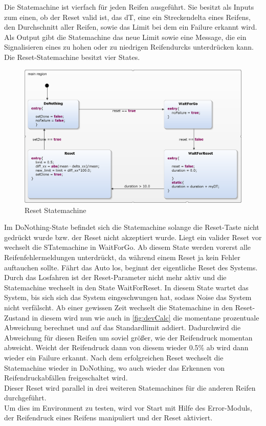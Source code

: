 Die Statemachine ist vierfach für jeden Reifen ausgeführt. Sie besitzt als Inputs zum einen, ob der Reset valid ist, das dT, eine ein Streckendelta eines Reifens, den Durchschnitt aller Reifen, sowie das Limit bei dem ein Failure erkannt wird. Als Output gibt die Statemachine das neue Limit sowie eine Message, die ein Signalisieren eines zu hohen oder zu niedrigen Reifendurcks unterdrücken kann.\\
Die Reset-Statemachine besitzt vier States.
\begin{figure}[H]
	\centering
	\includegraphics[width=1\linewidth]{../Graphiken/ResetStateMachine.png}
	\caption{Reset Statemachine}
	\label{fig:ResetStateMachine}
\end{figure}
Im DoNothing-State befindet sich die Statemachine solange die Reset-Taste nicht gedrückt wurde bzw. der Reset nicht akzeptiert wurde. Liegt ein valider Reset vor wechselt die STatemachine in WaitForGo. Ab diesem State werden vorerst alle Reifenfehlermeldungen unterdrückt, da während einem Reset ja kein Fehler auftauchen sollte. Fährt das Auto los, beginnt der eigentliche Reset des Systems. Durch das Losfahren ist der Reset-Parameter nicht mehr aktiv und die Statemachine wechselt in den State WaitForReset. In diesem State wartet das System, bis sich sich das System eingeschwungen hat, sodass Noise das System nicht verfälscht. Ab einer gewissen Zeit wechselt die Statemachine in den Reset-Zustand in diesem wird nun wie auch in \autoref{fig:devCalc} die momentane prozentuale Abweichung berechnet und auf das Standardlimit addiert. Dadurchwird die Abweichung für diesen Reifen um soviel größer, wie der Reifendruck momentan abweicht. Weicht der Reifendruck dann von diesem wieder 0.5\% ab wird dann wieder ein Failure erkannt. Nach dem erfolgreichen Reset wechselt die Statemachine wieder in DoNothing, wo auch wieder das Erkennen von Reifendruckabfällen freigeschaltet wird.\\
Dieser Reset wird parallel in drei weiteren Statemachines für die anderen Reifen durchgeführt.\\


Um dies im Environment zu testen, wird vor Start mit Hilfe des Error-Moduls, der Reifendruck eines Reifens manipuliert und der Reset aktiviert.
